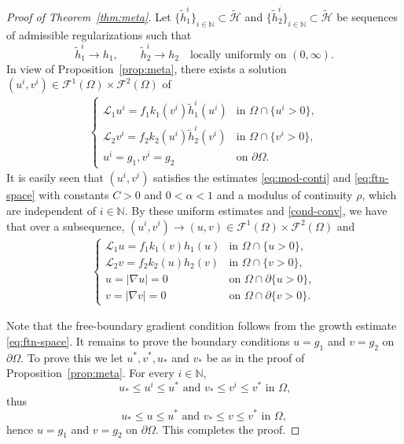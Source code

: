 \documentclass[11pt,oneside,english]{amsart}
\newcommand{\N}{{\mathbb N}}
\newcommand{\cL}{{\mathcal L}}
\newcommand{\cH}{{\mathcal H}}
\newcommand{\cF}{{\mathcal F}}
\newcommand{\al}{\alpha}
\newcommand{\D}{\nabla}
\numberwithin{equation}{section}
\theoremstyle{plain}
\numberwithin{equation}{section}
\begin{document}
\begin{proof}[Proof of Theorem~\ref{thm:meta}]
Let $\{\tilde h_1^i\}_{i\in\mathbb N}\subset\widetilde\cH$ and $\{\tilde h_2^i\}_{i\in\mathbb N}\subset \widetilde\cH$
be sequences of admissible regularizations such that
\[
\tilde h_1^i \to h_1,
\qquad
\tilde h_2^i \to h_2
\quad\text{locally uniformly on }(0,\infty).
\]
In view of Proposition~\ref{prop:meta}, there exists a solution $(u^i,v^i)\in \cF^1(\Omega)\times \cF^2(\Omega)$ of
\begin{align*}
    \begin{cases}
        \cL_1u^i=f_1k_1(v^i)\tilde h_1^i(u^i)&\text{in }\Omega\cap\{u^i>0\},\\
        \cL_2v^i=f_2k_2(u^i)\tilde h_2^i(v^i)&\text{in }\Omega\cap\{v^i>0\},\\
        u^i=g_1, v^i=g_2&\text{on }\partial\Omega.
    \end{cases}
\end{align*} 
It is easily seen that $(u^i,v^i)$ satisfies the estimates \eqref{eq:mod-conti} and \eqref{eq:ftn-space} with constants $C>0$ and $0<\al<1$ and a modulus of continuity $\rho$, which are independent of $i\in\N$. 
By these uniform estimates and \ref{cond-conv}, we have that over a subsequence, $(u^i,v^i)\to (u,v)\in \cF^1(\Omega)\times\cF^2(\Omega)$ and
\begin{align*}
    \begin{cases}
        \cL_1u=f_1k_1(v)h_1(u)&\text{in }\Omega\cap\{u>0\},\\
        \cL_2v=f_2k_2(u)h_2(v)&\text{in }\Omega\cap\{v>0\},\\
        u=|\D u|=0&\text{on }\Omega\cap\partial\{u>0\},\\
        v=|\D v|=0&\text{on }\Omega\cap\partial\{v>0\}.
    \end{cases}
\end{align*}

Note that the free-boundary gradient condition follows from the growth estimate \eqref{eq:ftn-space}.
It remains to prove the boundary conditions $u=g_1$ and $v=g_2$ on $\partial\Omega$. To prove this we  let $u^*,v^*,u_*$ and $v_*$ be as in the proof of Proposition~\ref{prop:meta}. For every $i\in\mathbb{N}$,
$$
\text{$u_*\le u^i\le u^*$ and $v_*\le v^i\le v^*$ in $\Omega$,}
$$
thus
$$
\text{$u_*\le u\le u^*$ and $v_*\le v\le v^*$ in $\Omega$},
$$
hence $u=g_1$ and $v=g_2$ on $\partial\Omega$. This completes the proof.
\end{proof}
\end{document}
